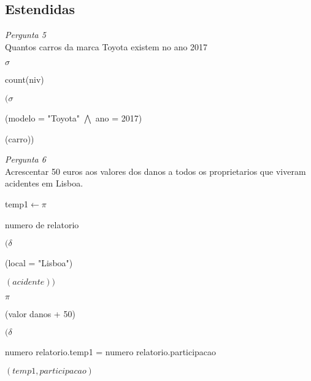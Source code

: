 \documentclass[12pt,a4paper]{article}
\begin{document}
\subsection*{Estendidas}
\textit{Pergunta 5}\\
Quantos carros da marca Toyota existem no ano 2017
\begin{center}
$\sigma$ \begin{tiny}
count(niv)
\end{tiny}$(\sigma$ \begin{tiny}
(modelo = "Toyota" $\bigwedge$ ano = 2017)
\end{tiny} (carro))
\end{center}
\textit{Pergunta 6}\\
Acrescentar 50 euros aos valores dos danos a todos os proprietarios que viveram acidentes em Lisboa.
\begin{center}
temp1$\longleftarrow \pi$\begin{tiny}
numero de relatorio
\end{tiny}$(\delta $ \begin{tiny}
(local = "Lisboa")
\end{tiny}$(acidente))$
\end{center}
\begin{center}
$\pi$ \begin{tiny}
(valor danos + 50)
\end{tiny}$(\delta$ \begin{tiny}
numero relatorio.temp1 = numero relatorio.participacao
\end{tiny}$(temp1,participacao)$
\end{center}
\end{document}
